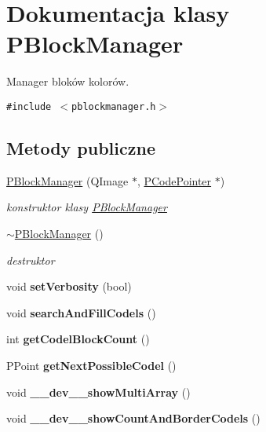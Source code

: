 \hypertarget{classPBlockManager}{
\section{Dokumentacja klasy PBlockManager}
\label{classPBlockManager}
}
Manager bloków kolorów.  


{\tt \#include $<$pblockmanager.h$>$}

\subsection*{Metody publiczne}
\begin{CompactItemize}
\item 
\hyperlink{classPBlockManager_f5a95fca85a31c0257b38b57cbb3378a}{PBlockManager} (QImage $\ast$, \hyperlink{classPCodePointer}{PCodePointer} $\ast$)
\begin{CompactList}\small\item\em konstruktor klasy \hyperlink{classPBlockManager}{PBlockManager} \item\end{CompactList}\item 
\hyperlink{classPBlockManager_52d7abb7f858625e9e014fb555f571a6}{$\sim$PBlockManager} ()
\begin{CompactList}\small\item\em destruktor \item\end{CompactList}\item 
\hypertarget{classPBlockManager_926e182e360300d6524fbb01fb90866b}{
void \textbf{setVerbosity} (bool)}
\label{classPBlockManager_926e182e360300d6524fbb01fb90866b}

\item 
\hypertarget{classPBlockManager_88f9f5226179e0fbd9d148001de10e97}{
void \textbf{searchAndFillCodels} ()}
\label{classPBlockManager_88f9f5226179e0fbd9d148001de10e97}

\item 
\hypertarget{classPBlockManager_ba7919eedd6b806f2f4da408423723ea}{
int \textbf{getCodelBlockCount} ()}
\label{classPBlockManager_ba7919eedd6b806f2f4da408423723ea}

\item 
\hypertarget{classPBlockManager_667f3673eda6cf4476ecb34d01db665b}{
PPoint \textbf{getNextPossibleCodel} ()}
\label{classPBlockManager_667f3673eda6cf4476ecb34d01db665b}

\item 
\hypertarget{classPBlockManager_e6298891058bd316c07071db0c851b2f}{
void \textbf{\_\-\_\-dev\_\-\_\-showMultiArray} ()}
\label{classPBlockManager_e6298891058bd316c07071db0c851b2f}

\item 
\hypertarget{classPBlockManager_d0ed8ac41d59c34eb88aa30428961a82}{
void \textbf{\_\-\_\-dev\_\-\_\-showCountAndBorderCodels} ()}
\label{classPBlockManager_d0ed8ac41d59c34eb88aa30428961a82}

\end{CompactItemize}
